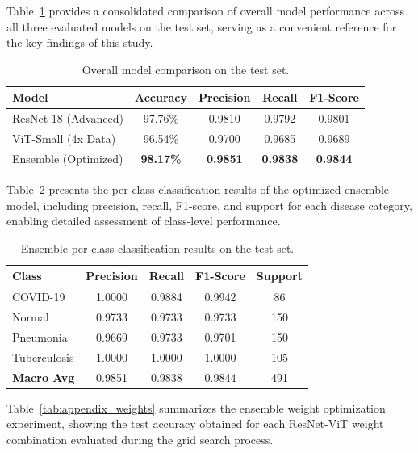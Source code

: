 \documentclass[12pt]{report}
\begin{document}
Table~\ref{tab:appendix_comparison} provides a consolidated comparison of overall model performance across all three evaluated models on the test set, serving as a convenient reference for the key findings of this study.

\begin{table}[h]
\centering
\caption{Overall model comparison on the test set.}
\label{tab:appendix_comparison}
\begin{tabular}{lcccc}
\hline
\textbf{Model} & \textbf{Accuracy} & \textbf{Precision} &
\textbf{Recall} & \textbf{F1-Score} \\
\hline
ResNet-18 (Advanced) & 97.76\% & 0.9810 & 0.9792 & 0.9801 \\
ViT-Small (4x Data)  & 96.54\% & 0.9700 & 0.9685 & 0.9689 \\
Ensemble (Optimized) & \textbf{98.17\%} & \textbf{0.9851}
                     & \textbf{0.9838} & \textbf{0.9844} \\
\hline
\end{tabular}
\end{table}

Table~\ref{tab:appendix_ensemble_perclass} presents the per-class classification results of the optimized ensemble model, including precision, recall, F1-score, and support for each disease category, enabling detailed assessment of class-level performance.

\begin{table}[h]
\centering
\caption{Ensemble per-class classification results on the test set.}
\label{tab:appendix_ensemble_perclass}
\begin{tabular}{lcccc}
\hline
\textbf{Class} & \textbf{Precision} & \textbf{Recall} &
\textbf{F1-Score} & \textbf{Support} \\
\hline
COVID-19     & 1.0000 & 0.9884 & 0.9942 & 86  \\
Normal       & 0.9733 & 0.9733 & 0.9733 & 150 \\
Pneumonia    & 0.9669 & 0.9733 & 0.9701 & 150 \\
Tuberculosis & 1.0000 & 1.0000 & 1.0000 & 105 \\
\hline
\textbf{Macro Avg} & 0.9851 & 0.9838 & 0.9844 & 491 \\
\hline
\end{tabular}
\end{table}

Table~\ref{tab:appendix_weights} summarizes the ensemble weight optimization experiment, showing the test accuracy obtained for each ResNet-ViT weight combination evaluated during the grid search process.
\end{document}
